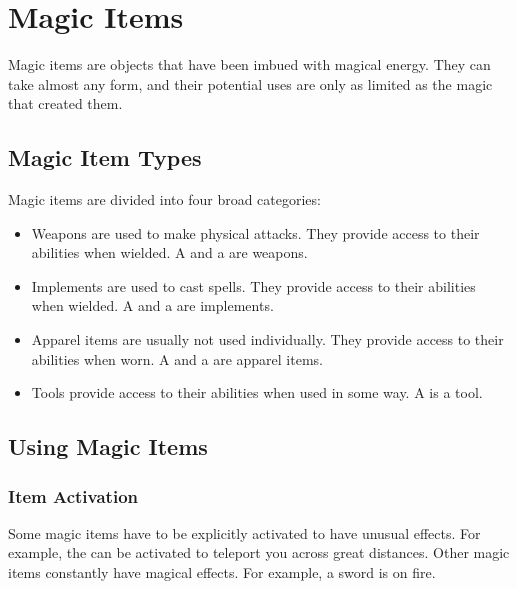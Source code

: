 \chapter{Magic Items}

Magic items are objects that have been imbued with magical energy. They can take almost any form, and their potential uses are only as limited as the magic that created them.

\section{Magic Item Types}
    Magic items are divided into four broad categories:
    \begin{itemize}
        \item Weapons are used to make physical attacks. They provide access to their abilities when wielded.
            A  and a  are weapons.
        \item Implements are used to cast spells. They provide access to their abilities when wielded.
            A  and a  are implements.
        \item Apparel items are usually not used individually. They provide access to their abilities when worn.
            A  and a  are apparel items.
        \item Tools provide access to their abilities when used in some way.
            A  is a tool.
    \end{itemize}

\section{Using Magic Items}

    \subsection{Item Activation}

        Some magic items have to be explicitly activated to have unusual effects.
        For example, the  can be activated to teleport you across great distances.
        Other magic items constantly have magical effects.
        For example, a  sword is on fire.

